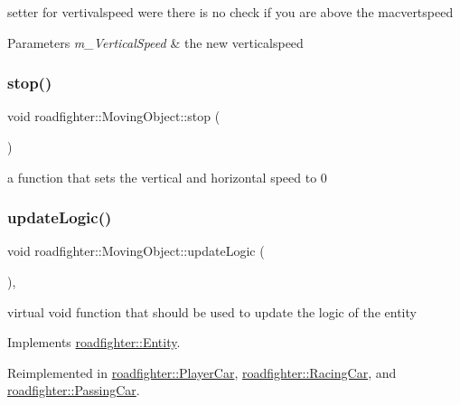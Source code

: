 setter for vertivalspeed were there is no check if you are above the macvertspeed 
\begin{DoxyParams}{Parameters}
{\em m\+\_\+\+Vertical\+Speed} & the new verticalspeed \\
\hline
\end{DoxyParams}
\mbox{\label{classroadfighter_1_1MovingObject_ac9f197ee0e91754d2fd653c0b8c84c57}} 
\subsubsection{\texorpdfstring{stop()}{stop()}}
{\footnotesize\ttfamily void roadfighter\+::\+Moving\+Object\+::stop (\begin{DoxyParamCaption}{ }\end{DoxyParamCaption})\hspace{0.3cm}{\ttfamily [virtual]}}

a function that sets the vertical and horizontal speed to 0 \mbox{\label{classroadfighter_1_1MovingObject_a2c5d69054a59fc5c6d7458f864ee9d57}} 
\subsubsection{\texorpdfstring{update\+Logic()}{updateLogic()}}
{\footnotesize\ttfamily void roadfighter\+::\+Moving\+Object\+::update\+Logic (\begin{DoxyParamCaption}{ }\end{DoxyParamCaption})\hspace{0.3cm}{\ttfamily [override]}, {\ttfamily [virtual]}}

virtual void function that should be used to update the logic of the entity 

Implements \hyperlink{classroadfighter_1_1Entity_a54c00f1af306290bae3e4b84e196566b}{roadfighter\+::\+Entity}.



Reimplemented in \hyperlink{classroadfighter_1_1PlayerCar_a01480487ca7978a50a3c6609f1ebe6df}{roadfighter\+::\+Player\+Car}, \hyperlink{classroadfighter_1_1RacingCar_af3f3b4c368ba61c13dc9b99004895c5d}{roadfighter\+::\+Racing\+Car}, and \hyperlink{classroadfighter_1_1PassingCar_ac3fe3087290121bf44880f94efa3a916}{roadfighter\+::\+Passing\+Car}.

